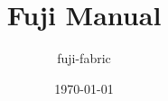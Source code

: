 \documentclass[10pt,oneside]{book}
\begin{document}
    \title{
        \textbf{Fuji Manual}\\[0.5em]
        \large {\version}
    }
    \author{fuji-fabric}
    \date{\today}
    \maketitle

    \tableofcontents
    \mainmatter

    
    
    
    
    
    
\end{document}
